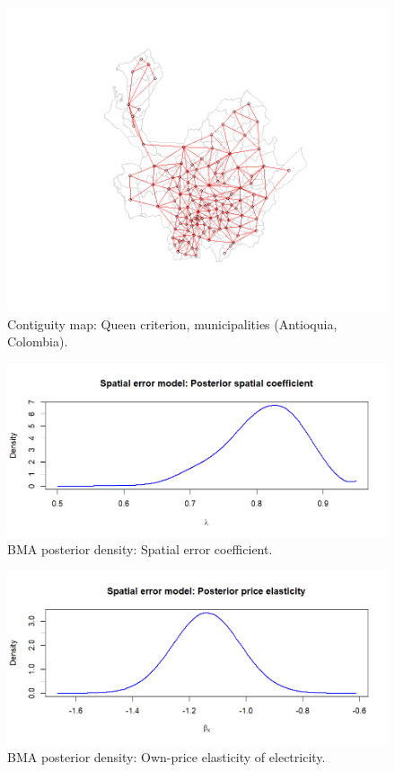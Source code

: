 \begin{figure}[!h]
	\includegraphics[width=340pt]{Chapters/chapter15/figures/AntMapCont.png}
	\caption[List of figure caption goes here]{Contiguity map: Queen criterion, municipalities (Antioquia, Colombia).}\label{FigINLAmap2}
\end{figure} 

\begin{figure}[!h]
	\includegraphics[width=340pt]{Chapters/chapter15/figures/SpaCoeff.png}
	\caption[List of figure caption goes here]{BMA posterior density: Spatial error coefficient.}\label{FigINLArho}
\end{figure} 

\begin{figure}[!h]
	\includegraphics[width=340pt]{Chapters/chapter15/figures/PriceElast.png}
	\caption[List of figure caption goes here]{BMA posterior density: Own-price elasticity of electricity.}\label{FigINLApriceelast}
\end{figure} 


